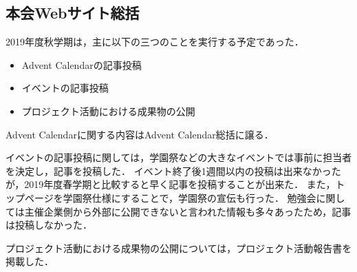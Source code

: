 \subsection*{本会Webサイト総括}


2019年度秋学期は，主に以下の三つのことを実行する予定であった．
\begin{itemize}
  \item Advent Calendarの記事投稿
  \item イベントの記事投稿
  \item プロジェクト活動における成果物の公開
\end{itemize}
Advent Calendarに関する内容はAdvent Calendar総括に譲る．

イベントの記事投稿に関しては，学園祭などの大きなイベントでは事前に担当者を決定し，記事を投稿した．
イベント終了後1週間以内の投稿は出来なかったが，2019年度春学期と比較すると早く記事を投稿することが出来た．
また，トップページを学園祭仕様にすることで，学園祭の宣伝も行った．
勉強会に関しては主催企業側から外部に公開できないと言われた情報も多々あったため，記事は投稿しなかった．

プロジェクト活動における成果物の公開については，プロジェクト活動報告書を掲載した．
